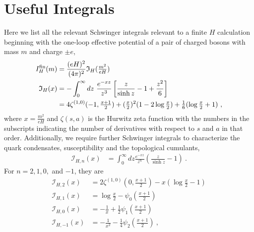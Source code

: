 \documentclass[12pt]{elsarticle}
\begin{document}
\section{Useful Integrals}
\label{sec:integrals}
\noindent
Here we list all the relevant Schwinger integrals relevant to a finite $H$ calculation beginning with the one-loop effective potential of a pair of charged bosons with mass $m$ and charge $\pm e$,
\begin{equation}
\begin{split}
\label{eq:Schwinger-integral}
I_{H}^{\rm fin}(m)&=\frac{(eH)^{2}}{(4\pi)^{2}}\mathfrak{I}_{H}(\tfrac{m^{2}}{eH})\\
\mathfrak{I}_{H}(x)&=-\int_{0}^{\infty}dz\ \frac{e^{-xz}}{z^{3}}\left[\frac{z}{\sinh z}-1+\frac{z^{2}}{6}\right]\\
&=4\zeta^{(1,0)}(-1,\tfrac{x+1}{2})+(\tfrac{x}{2})^{2}(1-2\log \tfrac{x}{2})+\tfrac{1}{6}(\log \tfrac{x}{2}+1)\ ,
\end{split}
\end{equation}
 where $x=\frac{m^{2}}{eH}$ and $\zeta(s,a)$ is the Hurwitz zeta function with the numbers in the subscripts indicating the number of derivatives with respect to $s$ and $a$ in that order. 
Additionally, we require further Schwinger integrals to characterize the quark condensates, susceptibility and the topological cumulants,
\begin{equation}
\begin{split}
\label{eq:IHn}
\mathcal{I}_{H,n}(x)&=\int_{0}^{\infty}dz\frac{e^{-xz}}{z^{n}}\left(\frac{z}{\sinh z}-1\right)\ .
\end{split}
\end{equation}
For $n=2,1,0,$ and $-1$, they are 
\begin{align}
\label{eq:IH2}
\mathcal{I}_{H,2}(x)&=2\zeta^{(1,0)}(0,\tfrac{x+1}{2})-x(\log \tfrac{x}{2}-1)\\
\label{eq:IH1}
\mathcal{I}_{H,1}(x)&=\log\tfrac{x}{2}-\psi_{0}\left (\tfrac{x+1}{2} \right)\\
\label{eq:IH0}
\mathcal{I}_{H,0}(x)&=-\tfrac{1}{x}+\tfrac{1}{2}\psi_{1}(\tfrac{x+1}{2})\\
\label{eq:IH-1}
\mathcal{I}_{H,-1}(x)&=-\tfrac{1}{x^{2}}-\tfrac{1}{4}\psi_{2}(\tfrac{x+1}{2})\ ,
\end{align}
\end{document}
